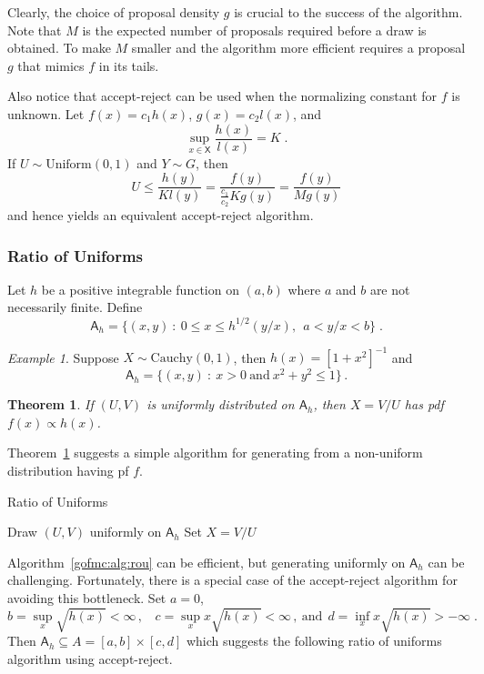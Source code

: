 \documentclass[12pt]{article}
\theoremstyle{plain}
\newtheorem{thm}{Theorem}[section]
\theoremstyle{definition}
\theoremstyle{remark}
\newtheorem{example}{Example}[section]
\newcommand{\sX}{\mathsf{X}}
\newcommand{\sA}{\mathsf{A}}
\begin{document}
Clearly, the choice of proposal density $g$ is crucial to the success
of the algorithm.  Note that $M$ is the expected number of proposals
required before a draw is obtained.  To make $M$ smaller and the
algorithm more efficient requires a proposal $g$ that mimics $f$ in
its tails.

Also notice that accept-reject can be used when the normalizing
constant for $f$ is unknown.  Let $f(x) =c_1 h(x)$, $g(x) = c_2 l(x)$,
and
\[
\sup_{x \in \sX} \frac{h(x)}{l(x)} = K\; .
\]
If $U \sim \text{Uniform}(0,1)$ and $Y \sim G$, then 
\[
U \le \frac{h(y)}{Kl(y)} = \frac{f(y)}{\frac{c_1}{c_2} K g(y)} = \frac{f(y)}{M g(y)}
\]
and hence yields an equivalent accept-reject algorithm.

\subsubsection{Ratio of Uniforms}

Let $h$ be a positive integrable function on $(a,b)$ where $a$ and
$b$ are not necessarily finite.  Define
\begin{equation}
\label{gofmc:eq:rou region}
\sA_h = \{(x,y)~:~ 0 \le x \le h^{1/2}(y/x), ~~a < y/x < b \} \; .
\end{equation}

\begin{example}
\label{gofmc:ex:rou cauchy}
Suppose $X \sim \text{Cauchy}(0,1)$, then $h(x) = [1+x^2]^{-1}$ and
\[
\sA_h = \{(x,y)~:~ x > 0~\text{and}~x^2 + y^2 \le 1\}\, .
\]
\end{example}

\begin{thm}
\label{gofmc:thm:rou}
If $(U,V)$ is uniformly distributed on $\sA_h$, then $X=V/U$ has pdf
$f(x) \propto h(x)$.
\end{thm}
Theorem~\ref{gofmc:thm:rou} suggests a simple algorithm for
generating from a non-uniform distribution having pf $f$.

\begin{algorithm}[H]
 \caption{Ratio of Uniforms} \label{gofmc:alg:rou}
 \begin{algorithmic}[1]
 \State Draw $(U,V)$ uniformly on $\sA_h$
 \State Set $X=V/U$   
 \end{algorithmic}
\end{algorithm}

Algorithm~\ref{gofmc:alg:rou} can be efficient, but generating
uniformly on $\sA_h$ can be challenging.  Fortunately, there is a
special case of the accept-reject algorithm for avoiding this
bottleneck.  Set $a=0$,
$$
b = \sup_{x} \sqrt{h(x)} < \infty\, , ~~~~ c = \sup_{x} x \sqrt{h(x)}
< \infty\, , ~ \text{and} ~~  d = \inf_{x} x \sqrt{h(x)} > -\infty \;
. 
$$
Then $\sA_h \subseteq A=[a,b] \times [c,d]$ which suggests the
following ratio of uniforms algorithm using accept-reject.
\end{document}

